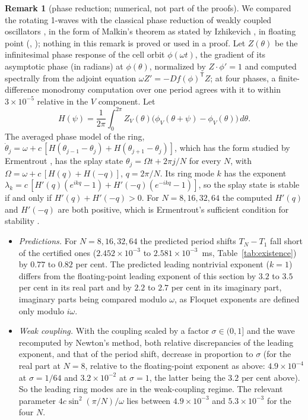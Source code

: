 \documentclass[11pt]{article}
\theoremstyle{definition}
\newtheorem{remark}[lemma]{Remark}
\begin{document}
\begin{remark}[phase reduction; numerical, not part of the proofs]\label{rem:phase}
We compared the rotating 1-waves with the classical phase reduction of weakly coupled oscillators \cite{as1992,hi1997}, in the form of Malkin's theorem as stated by Izhikevich \cite[Sect.~10.2.3]{izh2007}, in floating point (, ); nothing in this remark is proved or used in a proof. Let $Z(\theta)$ be the infinitesimal phase response of the cell orbit $\phi(\omega t)$, the gradient of its asymptotic phase (in radians) at $\phi(\theta)$, normalized by $Z\cdot\phi' = 1$ and computed spectrally from the adjoint equation $\omega Z' = -Df(\phi)^{\mathsf T}Z$; at four phases, a finite-difference monodromy computation over one period agrees with it to within $3 \times 10^{-5}$ relative in the $V$ component. Let
\[ H(\psi) = \frac1{2\pi}\int_0^{2\pi}Z_V(\theta)\big(\phi_V(\theta + \psi) - \phi_V(\theta)\big)\,d\theta. \]
The averaged phase model of the ring, $\dot\theta_j = \omega + c\,[H(\theta_{j-1} - \theta_j) + H(\theta_{j+1} - \theta_j)]$, which has the form studied by Ermentrout \cite{ermentrout1992}, has the splay state $\theta_j = \Omega t + 2\pi j/N$ for every $N$, with $\Omega = \omega + c\,[H(q) + H(-q)]$, $q = 2\pi/N$. Its ring mode $k$ has the exponent $\lambda_k = c\,[H'(q)(e^{ikq} - 1) + H'(-q)(e^{-ikq} - 1)]$, so the splay state is stable if and only if $H'(q) + H'(-q) > 0$. For $N = 8, 16, 32, 64$ the computed $H'(q)$ and $H'(-q)$ are both positive, which is Ermentrout's sufficient condition for stability \cite[Theorem~3.1 and Lemma~3.2]{ermentrout1992}.
\begin{itemize}
\item \emph{Predictions.} For $N = 8, 16, 32, 64$ the predicted period shifts $T_N - T_1$ fall short of the certified ones ($2.452 \times 10^{-3}$ to $2.581 \times 10^{-3}$~ms, Table~\ref{tab:existence}) by $0.77$ to $0.82$ per cent. The predicted leading nontrivial exponent ($k = 1$) differs from the floating-point leading exponent of this section by $3.2$ to $3.5$ per cent in its real part and by $2.2$ to $2.7$ per cent in its imaginary part, imaginary parts being compared modulo $\omega$, as Floquet exponents are defined only modulo $i\omega$.
\item \emph{Weak coupling.} With the coupling scaled by a factor $\sigma \in (0, 1]$ and the wave recomputed by Newton's method, both relative discrepancies of the leading exponent, and that of the period shift, decrease in proportion to $\sigma$ (for the real part at $N = 8$, relative to the floating-point exponent as above: $4.9 \times 10^{-4}$ at $\sigma = 1/64$ and $3.2 \times 10^{-2}$ at $\sigma = 1$, the latter being the $3.2$ per cent above). So the leading ring modes are in the weak-coupling regime. The relevant parameter $4c\sin^2(\pi/N)/\omega$ lies between $4.9 \times 10^{-3}$ and $5.3 \times 10^{-3}$ for the four $N$.

\end{itemize}
\end{remark}
\end{document}
